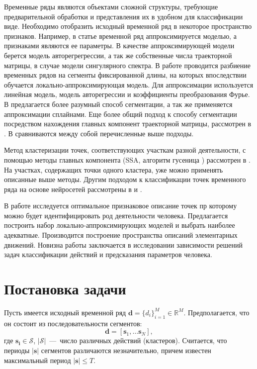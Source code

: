 \documentclass[12pt, twoside]{article}
\begin{document}
Временные ряды являются объектами сложной структуры, требующие предварительной обработки и представления их в удобном для классификации виде. Необходимо отобразить исходный временной ряд в некоторое пространство признаков. Например, в статье \cite{Ivkin15} временной ряд аппроксимируется моделью, а признаками являются ее параметры. В качестве аппроксимирующей модели берется модель авторегрегрессии, а так же собственные числа траекторной матрицы, в случае модели сингулярного спектра. В работе \cite{Karasikov16} проводится разбиение временных рядов на сегменты фиксированной длины, на которых впоследствии обучается локально-аппроксимирующая модель. Для аппроксимации используется линейная модель, модель авторегрессии и коэффициенты преобразования Фурье. В \cite{Anikeev18} предлагается более разумный способ сегментации, а так же применяется аппроксимации сплайнами. Еще более общий подход к способу сегментации посредством нахождения главных компонент траекторной матрицы, рассмотрен в \cite{Motrenko16}. В \cite{Bochkarev18} сравниваются между собой перечисленные выше подходы.

Метод кластеризации точек, соответствующих участкам разной деятельности, с помощью методы главных компонента (SSA, алгоритм гусеница \cite{Danilov97}) рассмотрен в \cite{Grabovoy20}. На участках, содержащих точки одного кластера, уже можно применять описанные выше методы. Другим подходом к классификации точек временного ряда на основе нейросетей рассмотрены в \cite{Dafne19} и \cite{Cinar18}.

В работе исследуется оптимальное признаковое описание точек пр которому можно будет идентифицировать род деятельности человека. Предлагается построить набор локально-аппроксимирующих моделей и выбрать наиболее адекватные. Производится построение пространства описаний элементарных движений. Новизна работы заключается в исследовании зависимости решений задач классификации действий и предсказания параметров человека.

\section{Постановка задачи}

Пусть имеется исходный временной ряд $\mathbf{d}=\{d_i\}_{i=1}^M\in \mathds{R}^M$. Предполагается, что он состоит из последовательности сегментов: 
$$\mathbf{d}=[\mathbf{s}_1, \ldots \mathbf{s}_N],$$
 где $\mathbf{s_i}\in \mathcal{S}$, $|\mathcal{S}|$~---~число различных действий (кластеров). Считается, что периоды $|\mathbf{s}|$ сегментов различаются незначительно, причем известен максимальный период $|\mathbf{s}|\leq T$.
\end{document}
